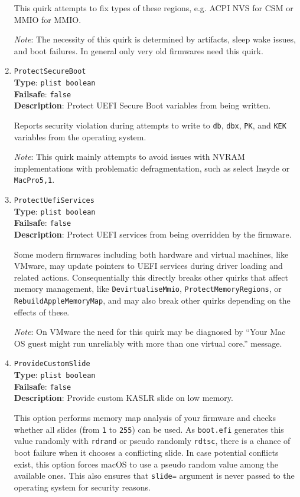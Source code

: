 \documentclass[]{article}
\begin{document}
\begin{enumerate}
  This quirk attempts to fix types of these regions, e.g. ACPI NVS for
  CSM or MMIO for MMIO.

  \emph{Note}: The necessity of this quirk is determined by artifacts, sleep
  wake issues, and boot failures. In general only very old firmwares need
  this quirk.

\item
  \texttt{ProtectSecureBoot}\\
  \textbf{Type}: \texttt{plist\ boolean}\\
  \textbf{Failsafe}: \texttt{false}\\
  \textbf{Description}: Protect UEFI Secure Boot variables from being written.

  Reports security violation during attempts to write to \texttt{db}, \texttt{dbx},
  \texttt{PK}, and \texttt{KEK} variables from the operating system.

  \emph{Note}: This quirk mainly attempts to avoid issues with NVRAM implementations
  with problematic defragmentation, such as select Insyde or \texttt{MacPro5,1}.

\item
  \texttt{ProtectUefiServices}\\
  \textbf{Type}: \texttt{plist\ boolean}\\
  \textbf{Failsafe}: \texttt{false}\\
  \textbf{Description}: Protect UEFI services from being overridden by the firmware.

  Some modern firmwares including both hardware and virtual machines, like VMware,
  may update pointers to UEFI services during driver loading and related actions.
  Consequentially this directly breaks other quirks that affect memory management,
  like \texttt{DevirtualiseMmio}, \texttt{ProtectMemoryRegions}, or \texttt{RebuildAppleMemoryMap},
  and may also break other quirks depending on the effects of these.

  \emph{Note}: On VMware the need for this quirk may be diagnosed by ``Your Mac OS guest
  might run unreliably with more than one virtual core.'' message.

\item
  \texttt{ProvideCustomSlide}\\
  \textbf{Type}: \texttt{plist\ boolean}\\
  \textbf{Failsafe}: \texttt{false}\\
  \textbf{Description}: Provide custom KASLR slide on low memory.

  This option performs memory map analysis of your firmware and checks whether
  all slides (from \texttt{1} to \texttt{255}) can be used. As \texttt{boot.efi}
  generates this value randomly with \texttt{rdrand} or pseudo randomly \texttt{rdtsc},
  there is a chance of boot failure when it chooses a conflicting slide. In case
  potential conflicts exist, this option forces macOS to use a pseudo random value
  among the available ones. This also ensures that \texttt{slide=} argument is never
  passed to the operating system for security reasons.


\end{enumerate}
\end{document}
